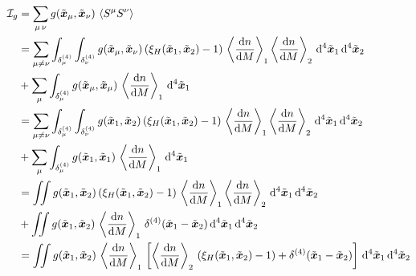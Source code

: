 \documentclass[../main.tex]{subfiles}
\begin{document}
\begin{align}
    \mathcal{I}_g &= \sum_{\mu\,\nu} g(\tilde{\boldsymbol{x}}_\mu,\tilde{\boldsymbol{x}}_\nu)\,\left\langle S^\mu S^\nu \right\rangle\\
     &= \sum_{\mu \neq \nu} \int_{\delta^{(4)}_\mu}\int_{\delta^{(4)}_\nu}g(\tilde{\boldsymbol{x}}_\mu,\tilde{\boldsymbol{x}}_\nu)\,( \xi_H(\tilde{\boldsymbol{x}}_1,\tilde{\boldsymbol{x}}_2) -1 )\,\left\langle \frac{\mathrm{d} n}{\mathrm{d} M} \right\rangle_1 \left\langle \frac{\mathrm{d} n}{\mathrm{d} M} \right\rangle_2 \,\mathrm{d}^4 \tilde{\boldsymbol{x}}_1\,\mathrm{d}^4 \tilde{\boldsymbol{x}}_2\nonumber\\
     &+ \sum_{\mu}  \int_{\delta^{(4)}_\mu} g(\tilde{\boldsymbol{x}}_\mu,\tilde{\boldsymbol{x}}_\mu)\,\left\langle \frac{\mathrm{d} n}{\mathrm{d} M} \right\rangle_1\,\mathrm{d}^4 \tilde{\boldsymbol{x}}_1\\
     &= \sum_{\mu \neq \nu} \int_{\delta^{(4)}_\mu}\int_{\delta^{(4)}_\nu}g(\tilde{\boldsymbol{x}}_1,\tilde{\boldsymbol{x}}_2)\,( \xi_H(\tilde{\boldsymbol{x}}_1,\tilde{\boldsymbol{x}}_2) -1 )\,\left\langle \frac{\mathrm{d} n}{\mathrm{d} M} \right\rangle_1 \left\langle \frac{\mathrm{d} n}{\mathrm{d} M} \right\rangle_2 \,\mathrm{d}^4 \tilde{\boldsymbol{x}}_1\,\mathrm{d}^4 \tilde{\boldsymbol{x}}_2\nonumber\\
     &+ \sum_{\mu}  \int_{\delta^{(4)}_\mu} g(\tilde{\boldsymbol{x}}_1,\tilde{\boldsymbol{x}}_1)\,\left\langle \frac{\mathrm{d} n}{\mathrm{d} M} \right\rangle_1\,\mathrm{d}^4 \tilde{\boldsymbol{x}}_1 \label{eq:microcells}\\
     &= \iint g(\tilde{\boldsymbol{x}}_1,\tilde{\boldsymbol{x}}_2)\,( \xi_H(\tilde{\boldsymbol{x}}_1,\tilde{\boldsymbol{x}}_2) -1 )\,\left\langle \frac{\mathrm{d} n}{\mathrm{d} M} \right\rangle_1 \left\langle \frac{\mathrm{d} n}{\mathrm{d} M} \right\rangle_2 \,\mathrm{d}^4 \tilde{\boldsymbol{x}}_1\,\mathrm{d}^4 \tilde{\boldsymbol{x}}_2\nonumber\\
     &+ \iint g(\tilde{\boldsymbol{x}}_1,\tilde{\boldsymbol{x}}_2)\,\left\langle \frac{\mathrm{d} n}{\mathrm{d} M} \right\rangle_1\,\delta^{(4)}(\tilde{\boldsymbol{x}}_1-\tilde{\boldsymbol{x}}_2)\,\mathrm{d}^4 \tilde{\boldsymbol{x}}_1\,\mathrm{d}^4 \tilde{\boldsymbol{x}}_2\\
     &= \iint g(\tilde{\boldsymbol{x}}_1,\tilde{\boldsymbol{x}}_2)\,\left\langle \frac{\mathrm{d} n}{\mathrm{d} M} \right\rangle_1\,\left[\left\langle \frac{\mathrm{d} n}{\mathrm{d} M} \right\rangle_2\,( \xi_H(\tilde{\boldsymbol{x}}_1,\tilde{\boldsymbol{x}}_2) -1 )+\delta^{(4)}(\tilde{\boldsymbol{x}}_1-\tilde{\boldsymbol{x}}_2)\right]\,\mathrm{d}^4\tilde{\boldsymbol{x}}_1\,\mathrm{d}^4\tilde{\boldsymbol{x}}_2 \label{eq:end_detivation_dirac}
\end{align}
\end{document}
